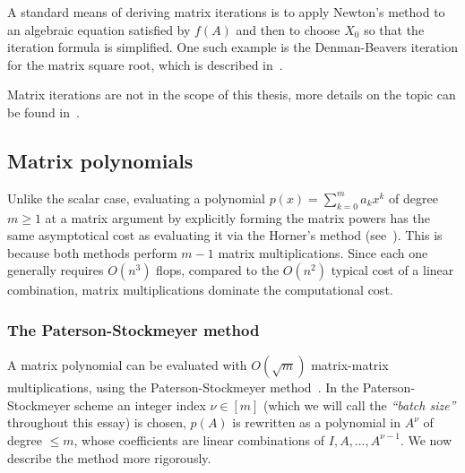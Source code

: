A standard means of deriving matrix iterations is to apply Newton’s method to an algebraic equation satisfied by $f(A)$ and then to choose $X_0$ so that the iteration formula is simplified. 
One such example is the Denman-Beavers iteration for the matrix square root, which is described in~\cite[§~6.3]{higham:matfun_book}. 

Matrix iterations are not in the scope of this thesis, more details on the topic can be found in~\cite[§~4.9]{higham:matfun_book}.


\subsection{Matrix polynomials}
Unlike the scalar case, evaluating a polynomial $p(x)=\sum_{k=0}^m a_kx^k$ of degree $m\ge 1$ at a matrix argument by explicitly forming the matrix powers has the same asymptotical cost as evaluating it via the Horner's method (see~\cite[Algs.~4.2,4.3]{higham:matfun_book}). This is because both methods perform $m-1$ matrix multiplications. Since each one generally requires $O(n^3)$ flops, compared to the $O(n^2)$ typical cost of a linear combination, matrix multiplications dominate the computational cost.

\subsubsection{The Paterson-Stockmeyer method}\label{subs:paterson-stockmeyer}
A matrix polynomial can be evaluated with $O(\sqrt{m})$ matrix-matrix multiplications, using the Paterson-Stockmeyer method~\cite{paterson_stockmeyer:article}.
In the Paterson-Stockmeyer scheme an integer index $\nu\in[m]$ (which we will call the \emph{``batch size''} throughout this essay) is chosen, $p(A)$ is rewritten as a polynomial in $A^{\nu}$ of degree $\le m$, whose coefficients are linear combinations of $I,A,\dots,A^{\nu-1}$. We now describe the method more rigorously.

